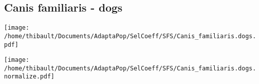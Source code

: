 \subsection{Canis familiaris - dogs} 
 
\begin{minipage}{0.49\linewidth} 
\texttt{[image: /home/thibault/Documents/AdaptaPop/SelCoeff/SFS/Canis\_familiaris.dogs.pdf]} 
\end{minipage}
\begin{minipage}{0.49\linewidth}
\texttt{[image: /home/thibault/Documents/AdaptaPop/SelCoeff/SFS/Canis\_familiaris.dogs.normalize.pdf]} 
\end{minipage}
